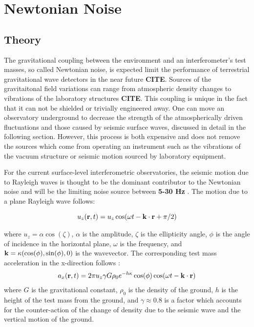 \documentclass [12pt, proquest]{uwthesis}[2019]
\begin{document}
\section{Newtonian Noise}
\subsection{Theory}

The gravitational coupling between the environment and an interferometer's test masses, so called Newtonian noise, is expected limit the performance of terrestrial gravitational wave detectors in the near future \textbf{CITE}. Sources of the gravitaitonal field variations can range from atmospheric density changes to vibrations of the laboratory structures \textbf{CITE}. This coupling is unique in the fact that it can not be shielded or trivially engineered away. One can move an observatory underground to decrease the strength of the atmospherically driven fluctuations and those caused by seismic surface waves, discussed in detail in the following section. However, this process is both expensive and does not remove the sources which come from operating an instrument such as the vibrations of the vacuum structure or seismic motion sourced by laboratory equipment. 

For the current surface-level interferometric observatories, the seismic motion due to Rayleigh waves is thought to be the dominant contributor to the Newtonian noise and will be the limiting noise source between \textbf{5-30 Hz} \cite{}. The motion due to a plane Rayleigh wave follows:

\begin{equation}
u_z({\bf r} ,t)=u_z \cos(\omega t-{\bf k}\cdot{\bf r}+\pi/2) \label{uz}
\end{equation}

where $u_z=\alpha \cos(\zeta)$, $\alpha$ is the amplitude, $\zeta$ is the ellipticity angle, $\phi$ is the angle of incidence in the horizontal plane, $\omega$ is the frequency, and $\bf{k}=\kappa (\cos(\phi),\sin(\phi),\text{0})$ is the wavevector. The corresponding test mass acceleration in the x-direction follows \cite{Harms_2016}:
\begin{equation}
a_x({\bf r} ,t)=2 \pi u_z \gamma G \rho_0 e^{-h \kappa}  \cos(\phi) \cos(\omega t-{\bf k}\cdot{\bf r}) \label{a}
\end{equation}
where $G$ is the gravitational constant, $\rho_0$ is the density of the ground, $h$ is the height of the test mass from the ground, and $\gamma \approx 0.8$ is a factor which accounts for the counter-action of the change of density due to the seismic wave and the vertical motion of the ground.
\end{document}
